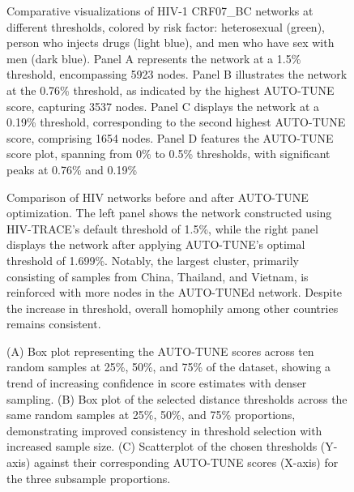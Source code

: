 \documentclass[utf8]{FrontiersinHarvard} %
\begin{document}
\begin{figure}[h!]
\caption{ Comparative visualizations of HIV-1 CRF07\_BC networks at different
  thresholds, colored by risk factor: heterosexual (green), person who injects
  drugs (light blue), and men who have sex with men (dark blue). Panel A
  represents the network at a 1.5\% threshold, encompassing 5923 nodes. Panel B
  illustrates the network at the 0.76\% threshold, as indicated by the highest
  AUTO-TUNE score, capturing 3537 nodes. Panel C displays the network at a
  0.19\% threshold, corresponding to the second highest AUTO-TUNE score,
  comprising 1654 nodes. Panel D features the AUTO-TUNE score plot, spanning
  from 0\% to 0.5\% thresholds, with significant peaks at 0.76\% and 0.19\%
  }\label{fig:chinaScorePlot}
\end{figure}

\begin{figure}[h!]
\caption{ Comparison of HIV networks before and after AUTO-TUNE optimization.
  The left panel shows the network constructed using HIV-TRACE's default
  threshold of 1.5\%, while the right panel displays the network after applying
  AUTO-TUNE's optimal threshold of 1.699\%. Notably, the largest cluster,
  primarily consisting of samples from China, Thailand, and Vietnam, is
  reinforced with more nodes in the AUTO-TUNEd network. Despite the increase in
  threshold, overall homophily among other countries remains consistent.
 }\label{fig:scoreAbove2}
\end{figure}

\begin{figure}[h!]
\caption{ (A) Box plot representing the AUTO-TUNE scores across ten random
  samples at 25\%, 50\%, and 75\% of the \cite{rhee_national_2019} dataset,
  showing a trend of increasing confidence in score estimates with denser
  sampling. (B) Box plot of the selected distance thresholds across the same
  random samples at 25\%, 50\%, and 75\% proportions, demonstrating improved
  consistency in threshold selection with increased sample size. (C)
  Scatterplot of the chosen thresholds (Y-axis) against their corresponding
  AUTO-TUNE scores (X-axis) for the three subsample proportions.
  }\label{fig:subsampling}
\end{figure}
\end{document}
